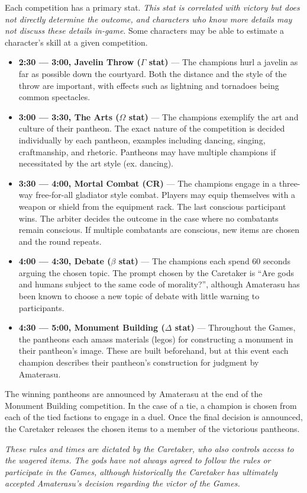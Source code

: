 \documentclass[green]{guardians}
\begin{document}
Each competition has a primary stat. \emph{This stat is correlated with victory but does not directly determine the outcome, and characters who know more details may not discuss these details in-game}. Some characters may be able to estimate a character's skill at a given competition.

\begin{itemize}
  \item \textbf{2:30 --- 3:00, Javelin Throw ($\Gamma$ stat)} --- The champions hurl a javelin as far as possible down the courtyard. Both the distance and the style of the throw are important, with effects such as lightning and tornadoes being common spectacles.
	\item \textbf{3:00 --- 3:30, The Arts ($\Omega$ stat)} --- The champions exemplify the art and culture of their pantheon. The exact nature of the competition is decided individually by each pantheon, examples including dancing, singing, craftmanship, and rhetoric. Pantheons may have multiple champions if necessitated by the art style (ex. dancing).
	\item \textbf{3:30 --- 4:00, Mortal Combat (CR)} --- The champions engage in a three-way free-for-all gladiator style combat. Players may equip themselves with a weapon or shield from the equipment rack. The last conscious participant wins. The arbiter decides the outcome in the case where no combatants remain conscious. If multiple combatants are conscious, new items are chosen and the round repeats.
	\item \textbf{4:00 --- 4:30, Debate ($\beta$ stat)} --- The champions each spend 60 seconds arguing the chosen topic. The prompt chosen by the Caretaker is ``Are gods and humans subject to the same code of morality?'', although Amaterasu has been known to choose a new topic of debate with little warning to participants.
	\item \textbf{4:30 --- 5:00, Monument Building ($\Delta$ stat)} --- Throughout the Games, the pantheons each amass materials (legos) for constructing a monument in their pantheon's image. These are built beforehand, but at this event each champion describes their pantheon's construction for judgment by Amaterasu.
\end{itemize}

The winning pantheons are announced by Amaterasu at the end of the Monument Building competition. In the case of a tie, a champion is chosen from each of the tied factions to engage in a duel. Once the final decision is announced, the Caretaker releases the chosen items to a member of the victorious pantheons.

\emph{These rules and times are dictated by the Caretaker, who also controls access to the wagered items. The gods have not always agreed to follow the rules or participate in the Games, although historically the Caretaker has ultimately accepted Amaterasu's decision regarding the victor of the Games.}
\end{document}
